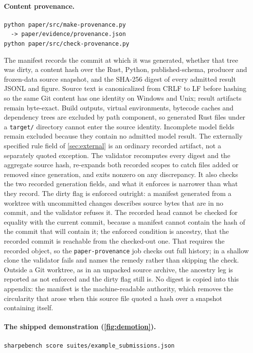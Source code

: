 \paragraph{Content provenance.}
\begin{verbatim}
python paper/src/make-provenance.py
  -> paper/evidence/provenance.json
python paper/src/check-provenance.py
\end{verbatim}
The manifest records the commit at which it was generated, whether that tree was dirty, a content hash over the Rust, Python, published-schema, producer and frozen-data source snapshot, and the SHA-256 digest of every admitted result JSONL and figure. Source text is canonicalized from CRLF to LF before hashing so the same Git content has one identity on Windows and Unix; result artifacts remain byte-exact. Build outputs, virtual environments, bytecode caches and dependency trees are excluded by path component, so generated Rust files under a \texttt{target/} directory cannot enter the source identity. Incomplete model fields remain excluded because they contain no admitted model result. The externally specified rule field of \cref{sec:external} is an ordinary recorded artifact, not a separately quoted exception. The validator recomputes every digest and the aggregate source hash, re-expands both recorded scopes to catch files added or removed since generation, and exits nonzero on any discrepancy. It also checks the two recorded generation fields, and what it enforces is narrower than what they record. The dirty flag is enforced outright: a manifest generated from a worktree with uncommitted changes describes source bytes that are in no commit, and the validator refuses it. The recorded head cannot be checked for equality with the current commit, because a manifest cannot contain the hash of the commit that will contain it; the enforced condition is ancestry, that the recorded commit is reachable from the checked-out one. That requires the recorded object, so the \texttt{paper-provenance} job checks out full history; in a shallow clone the validator fails and names the remedy rather than skipping the check. Outside a Git worktree, as in an unpacked source archive, the ancestry leg is reported as not enforced and the dirty flag still is. No digest is copied into this appendix: the manifest is the machine-readable authority, which removes the circularity that arose when this source file quoted a hash over a snapshot containing itself.

\paragraph{The shipped demonstration (\cref{fig:demotion}).}
\begin{verbatim}
sharpebench score suites/example_submissions.json
\end{verbatim}


